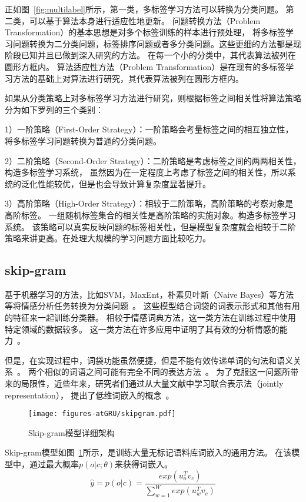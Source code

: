 正如图~\ref{fig:multilabel}所示，第一类，多标签学习方法可以转换为分类问题。
第二类，可以基于算法本身进行适应性地更新。
问题转换方法（Problem Transformation）的基本思想是对多个标签训练的样本进行预处理，
将多标签学习问题转换为二分类问题，标签排序问题或者多分类问题。这些更细的方法都是现阶段已知并且已做到深入研究的方法。
在每一个小的分类中，其代表算法被列在圆形方框内。
算法适应性方法（Problem Transformation）是在现有的多标签学习方法的基础上对算法进行研究，其代表算法被列在圆形方框内。

如果从分类策略上对多标签学习方法进行研究，则根据标签之间相关性将算法策略分为如下罗列的三个类别：

1）一阶策略（First-Order Strategy）：一阶策略会考量标签之间的相互独立性，将多标签学习问题转换为普通的分类问题。

2）二阶策略（Second-Order Strategy）：二阶策略是考虑标签之间的两两相关性，构造多标签学习系统，
虽然因为在一定程度上考虑了标签之间的相关性，所以系统的泛化性能较优，但是也会导致计算复杂度显著提升。

3）高阶策略（High-Order Strategy）：相较于二阶策略，高阶策略的考察对象是高阶标签。  
一组随机标签集合的相关性是高阶策略的实施对象。构造多标签学习系统。
该策略可以真实反映问题的标签相关性，但是模型复杂度就会相较于二阶策略来讲更高。在处理大规模的学习问题方面比较吃力。

\subsection{skip-gram}
基于机器学习的方法，比如SVM，MaxEnt，朴素贝叶斯（Naive Bayes）等方法等将情感分析任务转换为分类问题~。
这些模型结合词袋的词表示形式和其他有用的特征来一起训练分类器。
相较于情感词典方法，这一类方法在训练过程中使用特定领域的数据较多。
这一类方法在许多应用中证明了其有效的分析情感的能力~。

但是，在实现过程中，词袋功能虽然便捷，但是不能有效传递单词的句法和语义关系~。
两个相似的词语之间可能有完全不同的表达方法~。
为了克服这一问题所带来的局限性，近些年来，研究者们通过从大量文献中学习联合表示法（jointly representation），
提出了低维词嵌入的概念~。
\begin{figure}[h]
	\centering
	\texttt{[image: figures-atGRU/skipgram.pdf]}
	\caption{Skip-gram模型详细架构}
	\label{fig:skip-gram}
\end{figure}

Skip-gram模型如图~\ref{fig:skip-gram}所示，是训练大量无标记语料库词嵌入的通用方法。
在该模型中，通过最大概率${p\left(o|c;\theta \right)}$来获得词嵌入。
\begin{equation}
\widehat{y}=p\left ( o|c \right )=\frac{exp\left ( u_{o}^{T} v_{c}\right )}{\sum_{w=1}^{W}exp\left ( u_{w}^{T} v_{c}\right )}
\end{equation}

